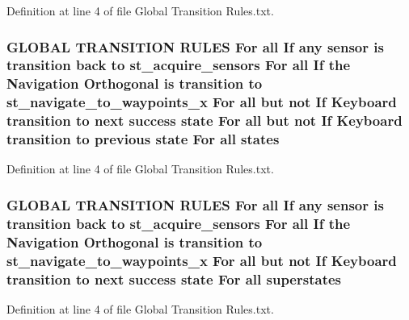 Definition at line 4 of file Global Transition Rules.\+txt.

\subsubsection[{\texorpdfstring{states}{states}}]{\setlength{\rightskip}{0pt plus 5cm}G\+L\+O\+B\+AL T\+R\+A\+N\+S\+I\+T\+I\+ON R\+U\+L\+ES For all If any sensor is transition back to st\+\_\+acquire\+\_\+sensors For all If the Navigation {\bf Orthogonal} is transition to st\+\_\+navigate\+\_\+to\+\_\+waypoints\+\_\+x For all but not If Keyboard transition to next success state For all but not If Keyboard transition to previous state For all states}\hypertarget{Global_01Transition_01Rules_8txt_a54d1602740c77675ed14ebfe688f4374}{}\label{Global_01Transition_01Rules_8txt_a54d1602740c77675ed14ebfe688f4374}


Definition at line 4 of file Global Transition Rules.\+txt.

\subsubsection[{\texorpdfstring{superstates}{superstates}}]{\setlength{\rightskip}{0pt plus 5cm}G\+L\+O\+B\+AL T\+R\+A\+N\+S\+I\+T\+I\+ON R\+U\+L\+ES For all If any sensor is transition back to st\+\_\+acquire\+\_\+sensors For all If the Navigation {\bf Orthogonal} is transition to st\+\_\+navigate\+\_\+to\+\_\+waypoints\+\_\+x For all but not If Keyboard transition to next success state For all superstates}\hypertarget{Global_01Transition_01Rules_8txt_af31ae27f561335eed0d5161d8ee256f8}{}\label{Global_01Transition_01Rules_8txt_af31ae27f561335eed0d5161d8ee256f8}


Definition at line 4 of file Global Transition Rules.\+txt.

